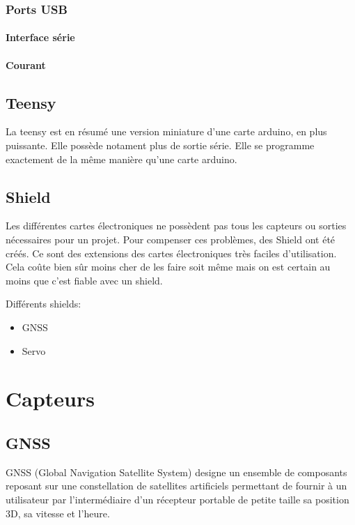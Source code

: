 \documentclass[a4paper, 11pt]{report}
\begin{document}
\subsection{Ports USB}

\subsubsection{Interface série}

\subsubsection{Courant}

\section{Teensy}
La teensy est en résumé une version miniature d'une carte arduino, en plus puissante. Elle possède notament plus de sortie série. Elle se programme exactement de la même manière qu'une carte arduino.

\section{Shield}
Les différentes cartes électroniques ne possèdent pas tous les capteurs ou sorties nécessaires pour un projet. Pour compenser ces problèmes, des Shield ont été créés. Ce sont des extensions des cartes électroniques très faciles d'utilisation. Cela coûte bien sûr moins cher de les faire soit même mais on est certain au moins que c'est fiable avec un shield.

Différents shields:
\begin{itemize}
\item GNSS
\item Servo
\end{itemize}

\chapter{Capteurs}

\section{GNSS}
GNSS (Global Navigation Satellite System)  designe un ensemble de composants reposant sur une constellation de satellites artificiels permettant de fournir à un utilisateur par l’intermédiaire d'un récepteur portable de petite taille sa position 3D, sa vitesse et l'heure.
\end{document}
